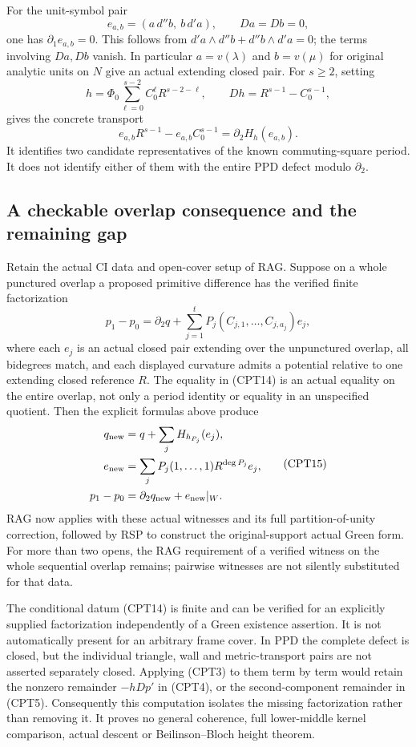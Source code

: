 For the unit-symbol pair
\[
                 e_{a,b}=(a\,d''b,\ b\,d'a),
           \qquad Da=Db=0,
 \tag{CPT11}
\]
one has $\partial_1e_{a,b}=0$.  This follows from
$d'a\wedge d''b+d''b\wedge d'a=0$; the terms involving
$Da,Db$ vanish.  In particular $a=v(\lambda)$ and
$b=v(\mu)$ for original analytic units on $N$ give an
actual extending closed pair.  For $s\ge2$, setting
\[
 h=\Phi_0\sum_{\ell=0}^{s-2}C_0^\ell R^{s-2-\ell},
                \qquad Dh=R^{s-1}-C_0^{s-1},
 \tag{CPT12}
\]
gives the concrete transport
\[
       e_{a,b}R^{s-1}-e_{a,b}C_0^{s-1}=\partial_2H_h(e_{a,b}).
 \tag{CPT13}
\]
It identifies two candidate representatives of the known
commuting-square period.  It does not identify either of them
with the entire PPD defect modulo $\partial_2$.

\subsection{A checkable overlap consequence and the remaining gap}

Retain the actual CI data and open-cover setup of RAG.  Suppose
on a whole punctured overlap a proposed primitive difference
has the verified finite factorization
\[
         p_1-p_0=\partial_2q+
               \sum_{j=1}^t P_j(C_{j,1},\ldots,C_{j,a_j})e_j,
 \tag{CPT14}
\]
where each $e_j$ is an actual closed pair extending over the
unpunctured overlap, all bidegrees match, and each displayed
curvature admits a potential relative to one extending closed
reference $R$.  The equality in (CPT14) is an actual equality
on the entire overlap, not only a period identity or equality
in an unspecified quotient.  Then the explicit formulas above
produce
\[
 \begin{split}
 q_{\rm new}&=q+\sum_jH_{h_{P_j}}(e_j),\\
 e_{\rm new}&=\sum_jP_j(1,\ldots,1)R^{\deg P_j}e_j,\\
                       p_1-p_0&=\partial_2q_{\rm new}+e_{\rm new}|_W.
 \end{split}
 \tag{CPT15}
\]
RAG now applies with these actual witnesses and its full
partition-of-unity correction, followed by RSP to construct
the original-support actual Green form.  For more than two
opens, the RAG requirement of a verified witness on the whole
sequential overlap remains; pairwise witnesses are not silently
substituted for that data.

The conditional datum (CPT14) is finite and can be verified for
an explicitly supplied factorization independently of a Green
existence assertion.  It is not automatically present for an
arbitrary frame cover.  In PPD the complete defect is closed,
but the individual triangle, wall and metric-transport pairs
are not asserted separately closed.  Applying (CPT3) to them
term by term would retain the nonzero remainder $-hDp'$ in
(CPT4), or the second-component remainder in (CPT5).
Consequently this computation isolates the missing
factorization rather than removing it.  It proves no general
coherence, full lower-middle kernel comparison, actual descent
or Beilinson--Bloch height theorem.

